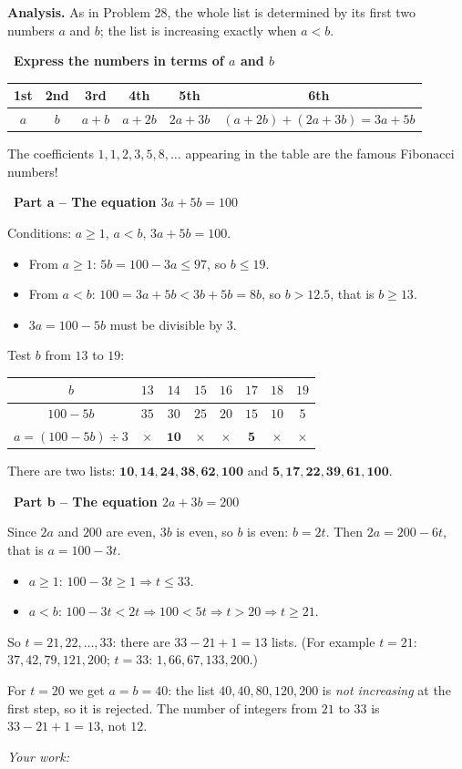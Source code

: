 \documentclass[11pt]{article}
\newif\ifsol \solfalse
\newcommand{\StuProb}[2]{\begin{probboxS}{#1}{#2}\StuProbBody\end{probboxS}}
\newcommand{\probsol}[1]{%
  \begin{lrbox}{\solmeasure}\begin{minipage}{\dimexpr\linewidth-24pt\relax}#1\end{minipage}\end{lrbox}%
  \ifsol
    \begin{solbox}#1\end{solbox}%
  \else
    \setlength{\solht}{\dimexpr\ht\solmeasure+\dp\solmeasure+0.85cm\relax}%
    \ifdim\solht<1.35cm\setlength{\solht}{1.35cm}\fi
    \ifdim\solht>\StudentMaxWork\setlength{\solht}{\StudentMaxWork}\fi
    \par\noindent\begin{minipage}{\linewidth}%
    \expandafter\StuProb\StuProbArgs
    \begin{tcolorbox}[colback=white,colframe=Line,boxrule=0.8pt,arc=5pt,
      left=8pt,right=8pt,top=4pt,bottom=4pt,height=\solht]{\footnotesize\color{Slate}\itshape\WorkWord}\end{tcolorbox}%
    \end{minipage}\par\medskip
  \fi}
\newlength{\StudentMaxWork}\setlength{\StudentMaxWork}{4.5cm}
\newcommand{\step}[2]{\par\smallskip\noindent{\bfseries\color{tmBlue!85!black}\StepWord~#1.}\ {\bfseries #2}\par\nopagebreak}
\def\WorkWord{Your work:}
\def\StepWord{Step}
\begin{document}
\probsol{
\textbf{Analysis.} As in Problem 28, the whole list is determined by its first two numbers $a$ and $b$; the list is increasing exactly when $a<b$.

\step{1}{Express the numbers in terms of $a$ and $b$}
\begin{center}\small
\begin{tabular}{|c|c|c|c|c|c|}
\hline
\rowcolor{tmBlue!10}1st & 2nd & 3rd & 4th & 5th & 6th\\ \hline
$a$ & $b$ & $a+b$ & $a+2b$ & $2a+3b$ & $(a+2b)+(2a+3b)=3a+5b$\\ \hline
\end{tabular}
\end{center}
\begin{tipbox}The coefficients $1,1,2,3,5,8,\dots$ appearing in the table are the famous Fibonacci numbers!\end{tipbox}

\step{2}{Part a -- The equation $3a+5b=100$}
Conditions: $a\ge 1$, $a<b$, $3a+5b=100$.
\begin{itemize}[leftmargin=1.3em,itemsep=1pt]
\item From $a\ge 1$: $5b=100-3a\le 97$, so $b\le 19$.
\item From $a<b$: $100=3a+5b<3b+5b=8b$, so $b>12.5$, that is $b\ge 13$.
\item $3a=100-5b$ must be divisible by $3$.
\end{itemize}
Test $b$ from $13$ to $19$:
\begin{center}\small
\begin{tabular}{|c|c|c|c|c|c|c|c|}
\hline
\rowcolor{tmBlue!10}$b$ & $13$ & $14$ & $15$ & $16$ & $17$ & $18$ & $19$\\ \hline
$100-5b$ & $35$ & $30$ & $25$ & $20$ & $15$ & $10$ & $5$\\ \hline
$a=(100-5b)\div 3$ & $\times$ & $\mathbf{10}$ & $\times$ & $\times$ & $\mathbf{5}$ & $\times$ & $\times$\\ \hline
\end{tabular}
\end{center}
There are two lists: $\mathbf{10, 14, 24, 38, 62, 100}$ and $\mathbf{5, 17, 22, 39, 61, 100}$.

\step{3}{Part b -- The equation $2a+3b=200$}
Since $2a$ and $200$ are even, $3b$ is even, so $b$ is even: $b=2t$. Then $2a=200-6t$, that is $a=100-3t$.
\begin{itemize}[leftmargin=1.3em,itemsep=1pt]
\item $a\ge 1$: $100-3t\ge 1 \Rightarrow t\le 33$.
\item $a<b$: $100-3t<2t \Rightarrow 100<5t \Rightarrow t>20 \Rightarrow t\ge 21$.
\end{itemize}
So $t=21,22,\dots,33$: there are $33-21+1=13$ lists. (For example $t=21$: $37, 42, 79, 121, 200$; $t=33$: $1, 66, 67, 133, 200$.)
\begin{warnbox}For $t=20$ we get $a=b=40$: the list $40,40,80,120,200$ is \emph{not increasing} at the first step, so it is rejected. The number of integers from $21$ to $33$ is $33-21+1=13$, not $12$.\end{warnbox}

}
\end{document}
